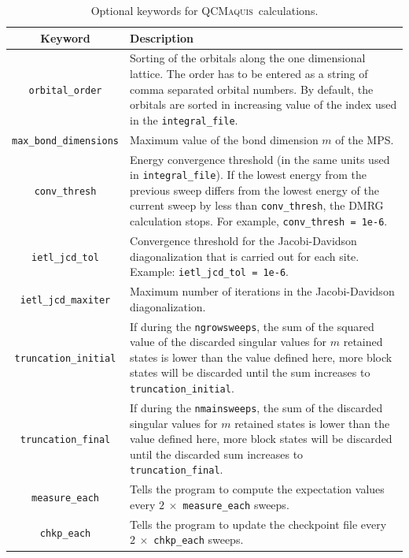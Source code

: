 \documentclass[bibliography=totoc,12pt,a4paper]{scrartcl}
\newcommand{\qcm}{\textsc{QCMaquis}}
\begin{document}
\begin{table}[htbp!]
  \caption{Optional keywords for \qcm\ calculations.}
  \label{tab:advanced_kw}
  \begin{tabular}{cV{11.5cm}}
	\toprule
    Keyword & Description \\
	\midrule
    \texttt{orbital\_order}
			& Sorting of the orbitals along the one dimensional lattice.
			  The order has to be entered as a string of comma separated orbital numbers.
		      By default, the orbitals are sorted in increasing value of the index used 
		      in the \texttt{integral\_file}. \\
    \texttt{max\_bond\_dimensions}
			& Maximum value of the bond dimension $m$ of the MPS. \\
    \texttt{conv\_thresh}
			& Energy convergence threshold (in the same units used in \texttt{integral\_file}).
			  If the lowest energy from the previous sweep differs from the lowest energy of the current sweep by less than \texttt{conv\_thresh}, the DMRG calculation stops.
			  For example, \texttt{conv\_thresh = 1e-6}. \\
    \texttt{ietl\_jcd\_tol} 
		    & Convergence threshold for the Jacobi-Davidson diagonalization that is carried out
			  for each site. Example: \texttt{ietl\_jcd\_tol = 1e-6}. \\
    \texttt{ietl\_jcd\_maxiter}
			& Maximum number of iterations in the Jacobi-Davidson diagonalization.\\
    \texttt{truncation\_initial}
			& If during the \texttt{ngrowsweeps}, the sum of the squared value of the discarded 
			  singular values for $m$ retained states is lower than the value defined here, more block states will be discarded until the sum increases 
		      to \texttt{truncation\_initial}. \\
    \texttt{truncation\_final}
			& If during the \texttt{nmainsweeps}, the sum of the discarded singular values for $m$ retained states is lower than the value defined here, more block states will be discarded until the discarded sum increases to \texttt{truncation\_final}. \\
	\texttt{measure\_each} 
			& Tells the program to compute the expectation values every $2\ \times$ \texttt{measure\_each} sweeps. \\
	\texttt{chkp\_each}
			& Tells the program to update the checkpoint file every $2\ \times$ \texttt{chkp\_each} sweeps. \\

\end{tabular}
\end{table}
\end{document}
